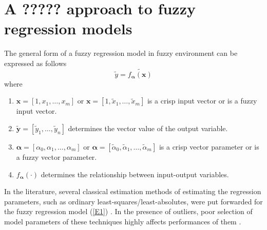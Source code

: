 \documentclass{IJFS}
\begin{document}
\section{A ????? approach to fuzzy regression models}\label{Prop}
The general form of a fuzzy regression model in fuzzy environment can be expressed as follows
\begin{equation}\label{E1}
\widetilde{y}   = \widetilde{f_{\boldsymbol{\alpha}}(\mathbf{x})}
\end{equation}
where
\begin{enumerate}
\item $\mathbf{x}=[1,x_1,\ldots,x_m]$
or $\mathbf{x}=[1,\widetilde{x}_1,\ldots,\widetilde{x}_m]$ is a crisp input vector or is a fuzzy input vector.
\item $\mathbf{\widetilde{y}}=[\widetilde{y}_1,\ldots,\widetilde{y}_n]$  determines the vector value of the output variable.
\item $\boldsymbol{\alpha}=[\alpha_0,\alpha_1,\ldots,\alpha_m]$  or $\boldsymbol{\alpha}=[\widetilde{\alpha}_0,\widetilde{\alpha}_1,\ldots,\widetilde{\alpha}_m]$ is a crisp  vector parameter or is a fuzzy  vector parameter.
\item $f_{\boldsymbol{\alpha}}(\cdot)$ determines the relationship  between input-output variables.
\end{enumerate}
In the literature,  several classical estimation methods of estimating the regression parameters, such as ordinary least-squares/least-absolutes, were put forwarded for the fuzzy regression model  (\ref{E1}) \cite{Cel87,Dia88,Chu19}.
In the presence of outliers, poor selection of model parameters of these techniques highly affects performances of them \cite{Dur11,Cha19}.
\end{document}
